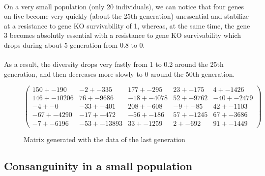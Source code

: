 \documentclass[]{report} %
\begin{document}
    \paragraph*{}
    On a very small population (only 20 individuals), we can notice that four genes on five become very quickly (about the 25th generation) unessential and stabilize 
    at a resistance to gene KO survivability of 1, whereas, at the same time, the gene 3 becomes absolutly essential 
    with a resistance to gene KO survivability which drops during about 5 generation from 0.8 to 0. 
    \paragraph*{}
    As a result, the diversity drops very fastly from 1 to 0.2 around the 25th generation, and then decreases more slowly to 0 around the 50th generation.
   

    \begin{figure}[H] 
            \centering
            \small
    $
          \begin{pmatrix}
                150 +- 190 & -2 +- 335 & 177 +- 295 & 23 +- 175 & 4 +- 1426 \\
                146 +- 10206 & 76 +- 9686 & -18 +- 4078 & 52 +- 9762 & -40 +- 2479 \\
                -4 +- 0 & -33 +- 401 & 208 +- 608 & -9 +- 85 & 42 +- 1103 \\
                -67 +- 4290 & -17 +- 472 & -56 +- 186 & 57 +- 1245 & 67 +- 3686 \\
                -7 +- 6196 & -53 +- 13893 & 33 +- 1259 & 2 +- 692 & 91 +- 1449 
           \end{pmatrix}
    $
            \caption{\footnotesize Matrix generated with the data of the last generation}
            \label{mat:ps20xg200xmr1-10-4}
    \end{figure}
    
    
    
    \newpage
\subsection{Consanguinity in a small population}
\end{document}

